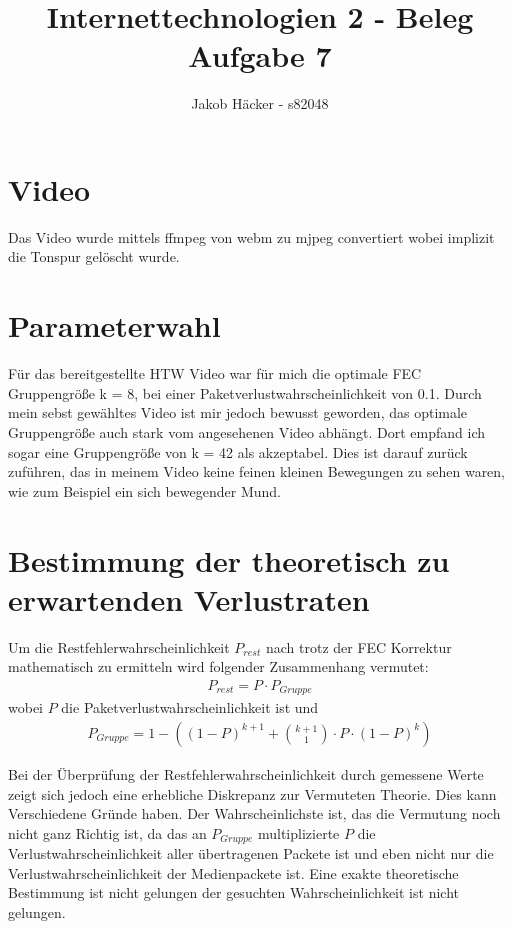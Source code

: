 \documentclass{article}
\begin{document}
\title{Internettechnologien 2 - Beleg Aufgabe 7}
\author{Jakob Häcker - s82048}

\begin{titlepage}
   \maketitle
\end{titlepage}

\newpage
    \section{Video}
        Das Video wurde mittels ffmpeg von webm zu mjpeg convertiert wobei implizit die Tonspur gelöscht wurde.
    \section{Parameterwahl}
        Für das bereitgestellte HTW Video war für mich die optimale FEC Gruppengröße k = 8, bei einer Paketverlustwahrscheinlichkeit von 0.1.
        Durch mein sebst gewähltes Video ist mir jedoch bewusst geworden, das optimale Gruppengröße auch stark vom angesehenen Video abhängt.
        Dort empfand ich sogar eine Gruppengröße von k = 42 als akzeptabel.
        Dies ist darauf zurück zuführen, das in meinem Video keine feinen kleinen Bewegungen zu sehen waren, wie zum Beispiel ein sich bewegender Mund.
    \section{Bestimmung der theoretisch zu erwartenden Verlustraten}
        Um die Restfehlerwahrscheinlichkeit $P_{rest}$ nach trotz der FEC Korrektur mathematisch zu ermitteln wird folgender Zusammenhang vermutet:
            \begin{align*}
                P_{rest} = P \cdot P_{Gruppe}
            \end{align*}
        wobei $P$ die Paketverlustwahrscheinlichkeit ist und 
            \begin{align*}
                P_{Gruppe} = 1 - \left((1-P)^{k+1} + \binom{k+1}{1} \cdot P \cdot (1-P)^k \right)
            \end{align*}

        Bei der Überprüfung der Restfehlerwahrscheinlichkeit durch gemessene Werte zeigt sich jedoch eine erhebliche Diskrepanz zur Vermuteten Theorie.
        Dies kann Verschiedene Gründe haben.
        Der Wahrscheinlichste ist, das die Vermutung noch nicht ganz Richtig ist, da das an $P_{Gruppe}$ multiplizierte $P$ die Verlustwahrscheinlichkeit aller übertragenen Packete ist und eben nicht nur die Verlustwahrscheinlichkeit
        der Medienpackete ist. Eine exakte theoretische Bestimmung ist nicht gelungen der gesuchten Wahrscheinlichkeit ist nicht gelungen.
\end{document}

